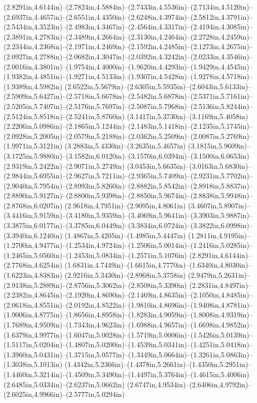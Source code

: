 (2.8291in,4.6144in)--(2.7824in,4.5884in)--(2.7433in,4.5536in)--(2.7134in,4.5120in)--(2.6937in,4.4657in)--(2.6551in,4.4350in)--(2.6248in,4.3974in)--(2.5812in,4.3791in)--(2.5434in,4.3523in)--(2.4983in,4.3467in)--(2.4564in,4.3317in)--(2.4194in,4.3085in)--(2.3891in,4.2783in)--(2.3489in,4.2664in)--(2.3130in,4.2464in)--(2.2728in,4.2459in)--(2.2344in,4.2368in)--(2.1971in,4.2469in)--(2.1592in,4.2485in)--(2.1273in,4.2675in)--(2.0927in,4.2788in)--(2.0682in,4.3047in)--(2.0392in,4.3242in)--(2.0233in,4.3546in)--(2.0016in,4.3801in)--(1.9754in,4.4000in)--(1.9620in,4.4293in)--(1.9429in,4.4545in)--(1.9382in,4.4851in)--(1.9271in,4.5133in)--(1.9307in,4.5428in)--(1.9278in,4.5718in)--(1.9389in,4.5982in) (2.6522in,5.5679in)--(2.6305in,5.5935in)--(2.6043in,5.6133in)--(2.5909in,5.6427in)--(2.5718in,5.6678in)--(2.5482in,5.6878in)--(2.5371in,5.7161in)--(2.5205in,5.7407in)--(2.5176in,5.7697in)--(2.5087in,5.7968in)--(2.5136in,5.8244in)--(2.5124in,5.8518in)--(2.5241in,5.8760in) (3.1417in,5.3730in)--(3.1169in,5.4058in) (2.2206in,5.0986in)--(2.1865in,5.1244in)--(2.1483in,5.1418in)--(2.1235in,5.1745in)--(2.0928in,5.2005in)--(2.0579in,5.2188in)--(2.0362in,5.2509in)--(2.0087in,5.2769in)--(1.9971in,5.3121in) (3.2883in,5.4330in)--(3.2635in,5.4657in) (3.1815in,5.9609in)--(3.1725in,5.9880in)--(3.1582in,6.0120in)--(3.1570in,6.0394in)--(3.1500in,6.0653in) (2.9319in,5.2422in)--(2.9071in,5.2749in) (3.0453in,5.6635in)--(3.0163in,5.6830in)--(2.9844in,5.6955in)--(2.9627in,5.7211in)--(2.9365in,5.7409in)--(2.9231in,5.7702in)--(2.9040in,5.7954in)--(2.8993in,5.8260in)--(2.8882in,5.8542in)--(2.8918in,5.8837in)--(2.8890in,5.9127in)--(2.8800in,5.9398in)--(2.8850in,5.9674in)--(2.8838in,5.9948in)--(2.8768in,6.0207in) (2.9618in,4.7951in)--(2.9095in,4.8061in) (3.4607in,5.8907in)--(3.4416in,5.9159in)--(3.4180in,5.9359in)--(3.4069in,5.9641in)--(3.3903in,5.9887in)--(3.3875in,6.0177in)--(3.3785in,6.0449in)--(3.3834in,6.0724in)--(3.3822in,6.0998in)--(3.3940in,6.1240in) (1.4867in,5.4205in)--(1.4985in,5.4447in) (1.2811in,4.9195in)--(1.2700in,4.9477in)--(1.2534in,4.9724in)--(1.2506in,5.0014in)--(1.2416in,5.0285in)--(1.2465in,5.0560in)--(1.2453in,5.0834in)--(1.2571in,5.1076in) (2.8291in,4.6144in)--(2.7768in,4.6254in) (1.6831in,4.7449in)--(1.6615in,4.7770in)--(1.6340in,4.8030in)--(1.6223in,4.8383in) (2.9216in,5.3430in)--(2.8968in,5.3758in) (2.9479in,5.2631in)--(2.9138in,5.2889in)--(2.8756in,5.3062in)--(2.8508in,5.3390in) (2.2831in,4.8497in)--(2.2382in,4.8645in)--(2.1920in,4.8690in)--(2.1469in,4.8635in)--(2.1050in,4.8485in)--(2.0618in,4.8551in)--(2.0192in,4.8522in)--(1.9810in,4.8696in)--(1.9408in,4.8781in)--(1.9006in,4.8775in)--(1.8656in,4.8958in)--(1.8283in,4.9059in)--(1.8008in,4.9319in)--(1.7689in,4.9509in)--(1.7343in,4.9623in)--(1.6988in,4.9657in)--(1.6698in,4.9852in)--(1.6379in,4.9977in)--(1.6047in,5.0028in)--(1.5719in,5.0006in)--(1.5426in,5.0139in)--(1.5117in,5.0204in)--(1.4807in,5.0200in)--(1.4539in,5.0341in)--(1.4251in,5.0418in)--(1.3960in,5.0431in)--(1.3715in,5.0577in)--(1.3449in,5.0664in)--(1.3261in,5.0863in)--(1.3038in,5.1013in) (1.4342in,5.2366in)--(1.4378in,5.2661in)--(1.4350in,5.2951in)--(1.4460in,5.3214in)--(1.4509in,5.3490in)--(1.4497in,5.3764in)--(1.4615in,5.4006in) (2.6485in,5.0334in)--(2.6237in,5.0662in) (2.6747in,4.9534in)--(2.6406in,4.9792in)--(2.6025in,4.9966in)--(2.5777in,5.0294in) 